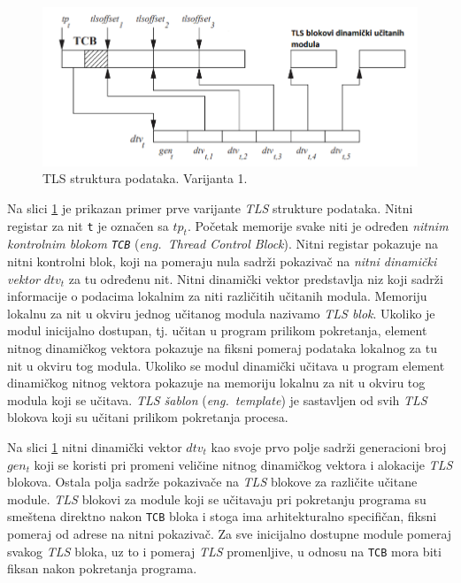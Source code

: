 \documentclass[12pt,oneside]{memoir}
\begin{document}
\begin{figure}[h!]
	\begin{center}
		\includegraphics[scale=0.6]{slike/TLSModelV1.png}
	\end{center}
	\caption{TLS struktura podataka. Varijanta 1.}
	\label{fig:tls_model1}
\end{figure}

Na slici \ref{fig:tls_model1} je prikazan primer prve varijante \emph{TLS} strukture podataka. Nitni registar za nit \texttt{t} je označen sa \texttt{$tp_t$}. Početak  memorije svake niti je određen \emph{nitnim kontrolnim blokom \texttt{TCB}} (\emph{eng.~Thread Control Block}). Nitni registar pokazuje na nitni kontrolni blok, koji na pomeraju nula sadrži pokazivač na \emph{nitni dinamički vektor} \texttt{$dtv_t$} za tu određenu nit. Nitni dinamički vektor predstavlja niz koji sadrži informacije o podacima lokalnim za niti različitih učitanih modula. Memoriju lokalnu za nit u okviru jednog učitanog modula nazivamo \emph{TLS blok}. Ukoliko je modul inicijalno dostupan, tj. učitan u program prilikom pokretanja, element nitnog dinamičkog vektora pokazuje na fiksni pomeraj podataka lokalnog za tu nit u okviru tog modula. Ukoliko se modul dinamički učitava u program element dinamičkog nitnog vektora pokazuje na memoriju lokalnu za nit u okviru tog modula koji se učitava. \emph{TLS šablon} (\emph{eng.~template}) je sastavljen od svih \emph{TLS} blokova koji su učitani prilikom pokretanja procesa.

Na slici \ref{fig:tls_model1} nitni dinamički vektor \texttt{$dtv_t$} kao svoje prvo polje sadrži generacioni broj \texttt{$gen_t$} koji se koristi pri promeni veličine nitnog dinamičkog vektora i alokacije \emph{TLS} blokova. Ostala polja sadrže pokazivače na \emph{TLS} blokove za različite učitane module. \emph{TLS} blokovi za module koji se učitavaju pri pokretanju programa su smeštena direktno nakon \texttt{TCB} bloka i stoga ima arhitekturalno specifičan, fiksni pomeraj od adrese na nitni pokazivač. Za sve inicijalno dostupne module pomeraj svakog \emph{TLS} bloka, uz to i pomeraj \emph{TLS} promenljive, u odnosu na \texttt{TCB} mora biti fiksan nakon pokretanja programa.
\end{document}
